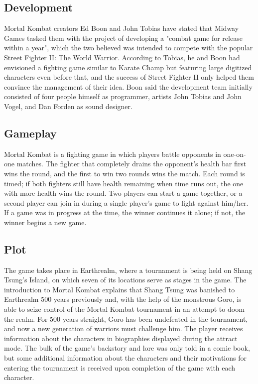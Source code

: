 \documentclass[a4paper,10pt]{book}
\begin{document}
 \subsection{Development }
 
            Mortal Kombat creators Ed Boon and John Tobias have stated that Midway Games tasked them with the project of developing a "combat game for release within a year", which the two believed was intended to compete with the popular Street Fighter II: The World Warrior. 
            According to Tobias, he and Boon had envisioned a fighting game similar to Karate Champ but featuring large digitized characters even before that, and the success of Street Fighter II only helped them convince the management of their idea. 
            Boon said the development team initially consisted of four people  himself as programmer, artists John Tobias and John Vogel, and Dan Forden as sound designer.
         
 \subsection{Gameplay }
 
 
            Mortal Kombat is a fighting game in which players battle opponents in one-on-one matches. 
            The fighter that completely drains the opponent's health bar first wins the round, and the first to win two rounds wins the match. 
            Each round is timed; if both fighters still have health remaining when time runs out, the one with more health wins the round. 
            Two players can start a game together, or a second player can join in during a single player's game to fight against him/her. 
            If a game was in progress at the time, the winner continues it alone; if not, the winner begins a new game.
         
 \subsection{Plot }
 
            The game takes place in Earthrealm, where a tournament is being held on Shang Tsung's Island, on which seven of its locations serve as stages in the game. 
            The introduction to Mortal Kombat explains that Shang Tsung was banished to Earthrealm 500 years previously and, with the help of the monstrous Goro, is able to seize control of the Mortal Kombat tournament in an attempt to doom the realm. 
            For 500 years straight, Goro has been undefeated in the tournament, and now a new generation of warriors must challenge him. The player receives information about the characters in biographies displayed during the attract mode. 
            The bulk of the game's backstory and lore was only told in a comic book, but some additional information about the characters and their motivations for entering the tournament is received upon completion of the game with each character.
         
\end{document}
